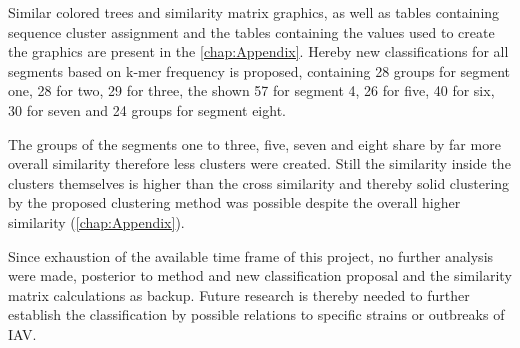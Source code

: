 Similar colored trees and similarity matrix graphics, as well as tables containing sequence cluster assignment and the tables containing the values used to create the graphics are present in the \autoref{chap:Appendix}. Hereby new classifications for all segments based on k-mer frequency is proposed, containing 28 groups for segment one, 28 for two, 29 for three, the shown 57 for segment 4, 26 for five, 40 for six, 30 for seven and 24 groups for segment eight. 

The groups of the segments one to three, five, seven and eight share by far more overall similarity therefore less clusters were created. Still the similarity inside the clusters themselves is higher than the cross similarity and thereby solid clustering by the proposed clustering method was possible despite the overall higher similarity (\autoref{chap:Appendix}). 

Since exhaustion of the available time frame of this project, no further analysis were made, posterior to method and new classification proposal and the similarity matrix calculations as backup. Future research is thereby needed to further establish the classification by possible relations to specific strains or outbreaks of \gls{IAV}.